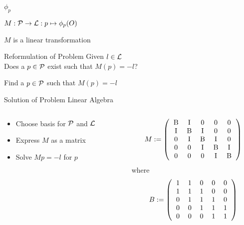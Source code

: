 \begin{frame}{$\phi_{p}$}
	\begin{definition}
		$M : \mathcal{P} \rightarrow \mathcal{L} : p \mapsto \phi_{p}(O)$
	\end{definition}
	
	\pause
	\bigskip	
	\begin{theorem}
		$M$ is a linear transformation
	\end{theorem}
\end{frame}

\begin{frame}{Reformulation of Problem}
	Given $l \in \mathcal{L}$\\
	Does a $p \in \mathcal{P}$ exist such that $M(p) = -l$?
	
	\pause
	\bigskip
	Find a $p \in \mathcal{P}$ such that $M(p) = -l$	
\end{frame}

\begin{frame}{Solution of Problem}
	Linear Algebra
	\begin{columns}[t]
		\begin{column}{0.45\textwidth}
			\begin{itemize}
				\item Choose basis for $\mathcal{P}$ and $\mathcal{L}$
				\item Express $M$ as a matrix
				\item Solve $M p = -l$ for $p$
			\end{itemize}

		\end{column}
		\begin{column}{0.45\textwidth}
			\[
				M := \left(
				\begin{tabular}{ccccc}
					B & I & 0 & 0 & 0 \\
					I & B & I & 0 & 0 \\
					0 & I & B & I & 0 \\
					0 & 0 & I & B & I \\
					0 & 0 & 0 & I & B \\
				\end{tabular}
				\right)
			\]
			where
			\[
				B := \left(
				\begin{tabular}{ccccc}
					1 & 1 & 0 & 0 & 0 \\
					1 & 1 & 1 & 0 & 0 \\
					0 & 1 & 1 & 1 & 0 \\
					0 & 0 & 1 & 1 & 1 \\
					0 & 0 & 0 & 1 & 1 \\
				\end{tabular}
				\right)
			\]
		\end{column}
	\end{columns}
\end{frame}

